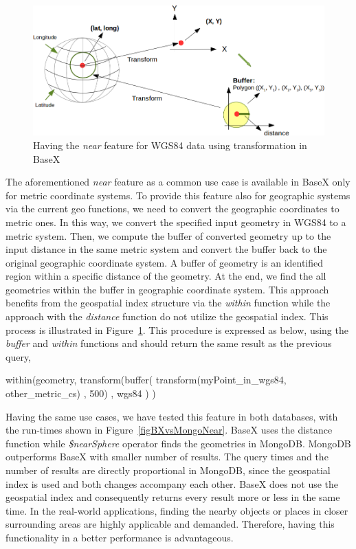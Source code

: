 \documentclass[a4paper,12pt]{article}
\begin{document}
\begin{figure}
\centering
\includegraphics[width=\textwidth]{Transform}
\caption{Having the \textit{near} feature for WGS84 data using transformation in BaseX}
\label{figTransform}
\end{figure}

The aforementioned \textit{near} feature as a common use case is available in BaseX only for metric coordinate systems. To provide this feature also for geographic systems via the current geo functions, we need to convert the geographic coordinates to metric ones. In this way, we convert the specified input geometry in WGS84 to a metric system. Then, we compute the buffer of converted geometry up to the input distance in the same metric system and convert the buffer back to the original geographic coordinate system. A buffer of geometry is an identified region within a specific distance of the geometry. At the end, we find the all geometries within the buffer in geographic coordinate system. This approach benefits from the geospatial index structure via the \textit{within} function while the approach with the \textit{distance} function do not utilize the geospatial index. This process is illustrated in Figure~\ref{figTransform}. 
This procedure is expressed as below, using the \textit{buffer} and \textit{within} functions and should return the same result as the previous query, 

\vspace{10px}
\begin{fakeJSON} 
within(geometry,
       transform(buffer(
                   transform(myPoint_in_wgs84, other_metric_cs)
                   , 500)
                 , wgs84
                )
      )
\end{fakeJSON}
\vspace{10px}
Having the same use cases, we have tested this feature in both databases, with the run-times shown in Figure~\ref{figBXvsMongoNear}. BaseX uses the distance function while \textit{\$nearSphere} operator finds the geometries in MongoDB. MongoDB outperforms BaseX with smaller number of results. The query times and the number of results are directly proportional in MongoDB, since the geospatial index is used and both changes accompany each other. BaseX does not use the geospatial index and consequently returns every result more or less in the same time. In the real-world applications, finding the nearby objects or places in closer surrounding areas are highly applicable and demanded. Therefore, having this functionality in a better performance is advantageous.
\end{document}
